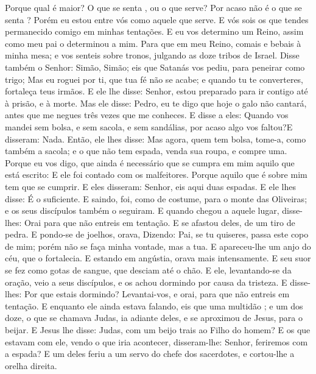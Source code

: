 {  Porque qual é maior? O que se senta
{}, ou o que serve? Por acaso não é o que se senta
{} ? Porém eu estou entre vós como aquele que serve.
  E vós sois os que tendes permanecido comigo em minhas tentações.
  E eu vos determino um Reino, assim como meu pai o determinou a mim.
  Para que em meu Reino, comais e bebais à minha mesa; e vos senteis sobre tronos, julgando as doze tribos de Israel.
  Disse também o Senhor: Simão, Simão; eis que Satanás vos pediu, para
{} peneirar como trigo;
  Mas eu roguei por ti, que tua fé não se acabe; e quando tu te converteres, fortaleça teus irmãos.
  E ele lhe disse: Senhor, estou preparado para ir contigo até à prisão, e à morte.
  Mas ele disse: Pedro, eu te digo que hoje o galo não cantará, antes que me negues três vezes que me conheces.
  E disse a eles: Quando vos mandei sem bolsa, e sem sacola, e sem sandálias, por acaso algo vos faltou?E disseram: Nada.
  Então, ele lhes disse: Mas agora, quem tem bolsa, tome-a, como também a sacola; e o que não tem espada, venda sua roupa, e compre uma.
  Porque eu vos digo, que ainda é necessário que se cumpra em mim aquilo que está escrito: E ele foi contado com os malfeitores. Porque aquilo que é sobre mim tem que se cumprir.
  E eles disseram: Senhor, eis aqui duas espadas. E ele lhes disse: É o suficiente.
  E saindo, foi, como de costume, para o monte das Oliveiras; e os seus discípulos também o seguiram.
  E quando chegou a aquele lugar, disse-lhes: Orai para que não entreis em tentação.
  E se afastou deles,
{} de um tiro de pedra. E pondo-se de joelhos, orava,
  Dizendo: Pai, se tu quiseres, passa este copo de mim; porém não se faça minha vontade, mas a tua.
  E apareceu-lhe um anjo do céu, que o fortalecia.
  E estando em angústia, orava mais intensamente. E seu suor se fez como gotas de sangue, que desciam até o chão.
  E ele, levantando-se da oração, veio a seus discípulos, e os achou dormindo por causa da tristeza.
  E disse-lhes: Por que estais dormindo? Levantai-vos, e orai, para que não entreis em tentação.
  E enquanto ele ainda estava falando, eis que uma multidão
{} ; e um dos doze, o que se chamava Judas, ia adiante deles, e se aproximou de Jesus, para o beijar.
  E Jesus lhe disse: Judas, com um beijo trais ao Filho do homem?
  E os que estavam com ele, vendo o que iria acontecer, disseram-lhe: Senhor, feriremos com a espada?
  E um deles feriu a um servo do chefe dos sacerdotes, e cortou-lhe a orelha direita.
}
